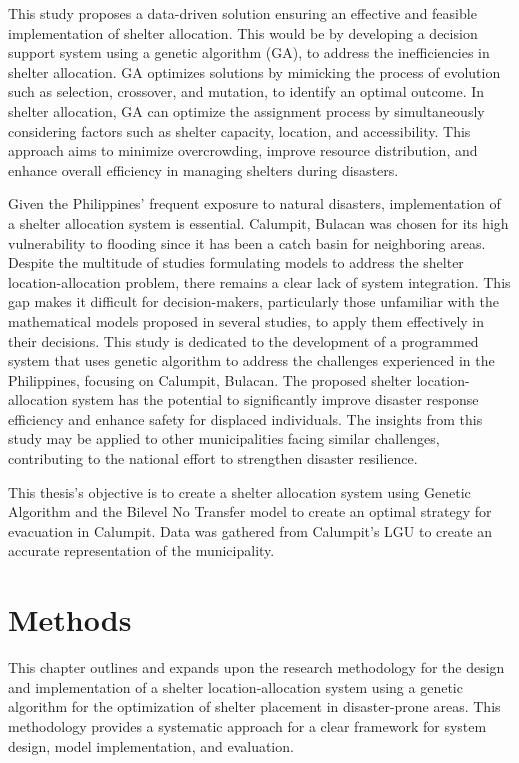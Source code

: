 \documentclass[11pt,letterpaper,]{article}
\begin{document}
	This study proposes a data-driven solution ensuring an effective and feasible implementation of shelter allocation. This would be by developing a decision support system using a genetic algorithm (GA), to address the inefficiencies in shelter allocation. GA optimizes solutions by mimicking the process of evolution such as selection, crossover, and mutation, to identify an optimal outcome. In shelter allocation, GA can optimize the assignment process by simultaneously considering factors such as shelter capacity, location, and accessibility. This approach aims to minimize overcrowding, improve resource distribution, and enhance overall efficiency in managing shelters during disasters.
	
	Given the Philippines’ frequent exposure to natural disasters, implementation of a shelter allocation system is essential. Calumpit, Bulacan was chosen for its high vulnerability to flooding since it has been a catch basin for neighboring areas. Despite the multitude of studies formulating models to address the shelter location-allocation problem, there remains a clear lack of system integration. This gap makes it difficult for decision-makers, particularly those unfamiliar with the mathematical models proposed in several studies, to apply them effectively in their decisions. This study is dedicated to the development of a programmed system that uses genetic algorithm to address the challenges experienced in the Philippines, focusing on Calumpit, Bulacan. The proposed shelter location-allocation system has the potential to significantly improve disaster response efficiency and enhance safety for displaced individuals. The insights from this study may be applied to other municipalities facing similar challenges, contributing to the national effort to strengthen disaster resilience.
	
	This thesis’s objective is to create a shelter allocation system using Genetic Algorithm and the Bilevel No Transfer model to create an optimal strategy for evacuation in Calumpit. Data was gathered from Calumpit’s LGU to create an accurate representation of the municipality.
	

\section{Methods}

This chapter outlines and expands upon the research methodology for the
design and implementation of a shelter location-allocation system using a genetic
algorithm for the optimization of shelter placement in disaster-prone areas. This
methodology provides a systematic approach for a clear framework for system
design, model implementation, and evaluation.
	
\end{document}
